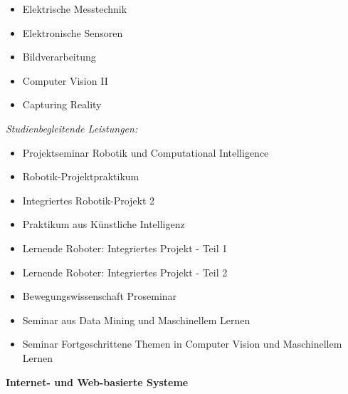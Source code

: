 {\begin{itemize}[noitemsep]
  \item Elektrische Messtechnik
  \item Elektronische Sensoren
  \item Bildverarbeitung
  \item Computer Vision II
  \item Capturing Reality
\end{itemize}
\textit{Studienbegleitende Leistungen:}
\begin{itemize}[noitemsep]
  \item Projektseminar Robotik und Computational Intelligence
  \item Robotik-Projektpraktikum
  \item Integriertes Robotik-Projekt 2
  \item Praktikum aus Künstliche Intelligenz
  \item Lernende Roboter: Integriertes Projekt - Teil 1
  \item Lernende Roboter: Integriertes Projekt - Teil 2
  \item Bewegungswissenschaft Proseminar
  \item Seminar aus Data Mining und Maschinellem Lernen
  \item Seminar Fortgeschrittene Themen in Computer Vision und Maschinellem Lernen
\end{itemize}

\noindent\textbf{Internet- und Web-basierte Systeme}

}
